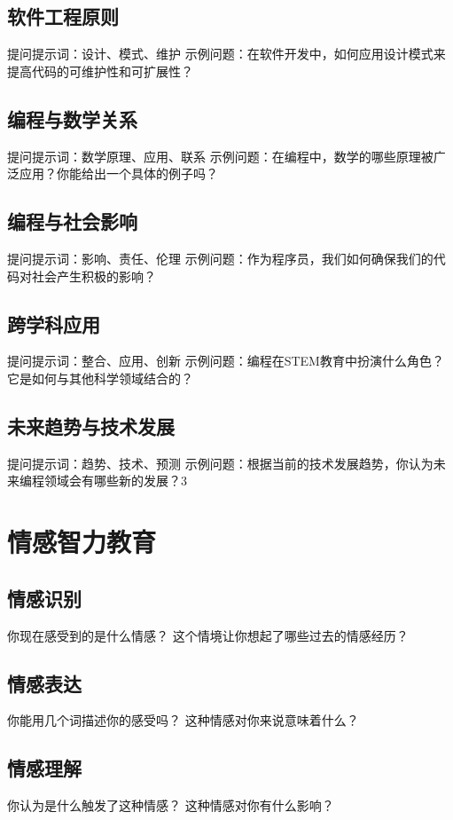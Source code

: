 \documentclass[12pt]{book}
\begin{document}
\subsection{软件工程原则}
提问提示词：设计、模式、维护
示例问题：在软件开发中，如何应用设计模式来提高代码的可维护性和可扩展性？

\subsection{编程与数学关系}
提问提示词：数学原理、应用、联系
示例问题：在编程中，数学的哪些原理被广泛应用？你能给出一个具体的例子吗？

\subsection{编程与社会影响}
提问提示词：影响、责任、伦理
示例问题：作为程序员，我们如何确保我们的代码对社会产生积极的影响？

\subsection{跨学科应用}
提问提示词：整合、应用、创新
示例问题：编程在STEM教育中扮演什么角色？它是如何与其他科学领域结合的？

\subsection{未来趋势与技术发展}
提问提示词：趋势、技术、预测
示例问题：根据当前的技术发展趋势，你认为未来编程领域会有哪些新的发展？3


\section{情感智力教育}
\subsection{情感识别}

你现在感受到的是什么情感？
这个情境让你想起了哪些过去的情感经历？

\subsection{情感表达}
你能用几个词描述你的感受吗？
这种情感对你来说意味着什么？

\subsection{情感理解}
你认为是什么触发了这种情感？
这种情感对你有什么影响？
\end{document}
